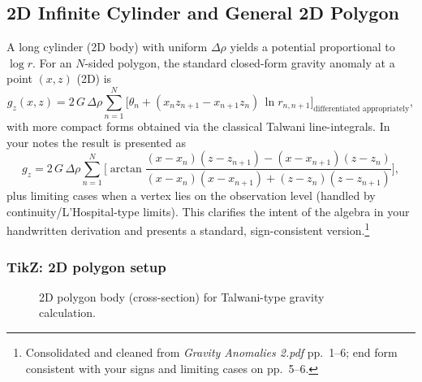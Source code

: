 \documentclass[11pt,a4paper]{article}
\begin{document}
\subsection{2D Infinite Cylinder and General 2D Polygon}
A long cylinder (2D body) with uniform $\Delta\rho$ yields a potential proportional to $\log r$. For an $N$-sided polygon, the standard closed-form gravity anomaly at a point $(x,z)$ (2D) is
\begin{equation}
  g_z(x,z) = 2\,G\,\Delta\rho\sum_{n=1}^{N} \Big[ \theta_n + (x_n z_{n+1}-x_{n+1} z_n)\,\ln r_{n,n+1} \Big]_{\text{differentiated appropriately}},
\end{equation}
with more compact forms obtained via the classical Talwani line-integrals. In your notes the result is presented as
\begin{equation}
  g_z = 2\,G\,\Delta\rho\sum_{n=1}^{N} \Big[ \arctan\frac{(x-x_n)(z-z_{n+1})-(x-x_{n+1})(z-z_n)}{(x-x_n)(x-x_{n+1})+(z-z_n)(z-z_{n+1})} \Big],\label{eq:polygon}
\end{equation}
plus limiting cases when a vertex lies on the observation level (handled by continuity/L'Hospital-type limits). This clarifies the intent of the algebra in your handwritten derivation and presents a standard, sign-consistent version.\footnote{Consolidated and cleaned from \emph{Gravity Anomalies 2.pdf} pp.~1--6; end form consistent with your signs and limiting cases on pp.~5--6.}

\subsubsection*{TikZ: 2D polygon setup}
\begin{figure}[h]
  \centering
  \caption{2D polygon body (cross-section) for Talwani-type gravity calculation.}
\end{figure}
\end{document}
